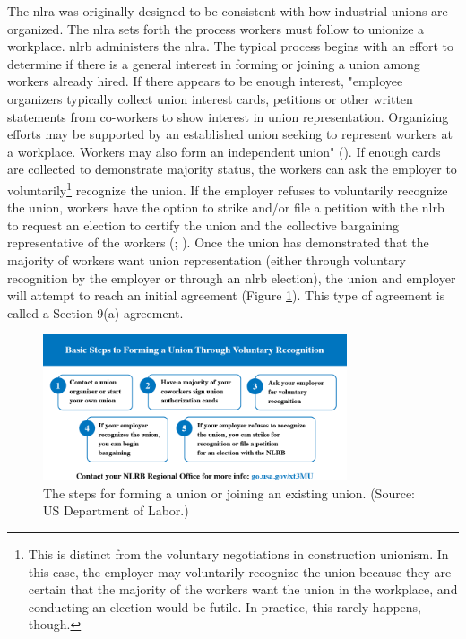 \documentclass[12pt]{article}
\newcommand{\imageWidth}{0.8\textwidth}
\begin{document}
The \acrfull{nlra} was originally designed to be consistent with how industrial unions are organized. The \acrshort{nlra} sets forth the process workers must follow to unionize a workplace. \acrfull{nlrb} administers the \acrshort{nlra}. The typical process begins with an effort to determine if there is a general interest in forming or joining a union among workers already hired. If there appears to be enough interest, "employee organizers typically collect union interest cards, petitions or other written statements from co-workers to show interest in union representation. Organizing efforts may be supported by an established union seeking to represent workers at a workplace. Workers may also form an independent union" (\cite["How can I form a union?"]{dolWORKCenterUnions}). If enough cards are collected to demonstrate majority status, the workers can ask the employer to voluntarily\footnote{This is distinct from the voluntary negotiations in construction unionism. In this case, the employer may voluntarily recognize the union because they are certain that the majority of the workers want the union in the workplace, and conducting an election would be futile. In practice, this rarely happens, though.} recognize the union. If the employer refuses to voluntarily recognize the union, workers have the option to strike and/or file a petition with the \acrshort{nlrb} to request an election to certify the union and the collective bargaining representative of the workers (\cite["How can I form a union?"]{dolWORKCenterUnions}; \cite{nlrbNLRBProcess}). Once the union has demonstrated that the majority of workers want union representation (either through voluntary recognition by the employer or through an \acrshort{nlrb} election), the union and employer will attempt to reach an initial agreement (Figure \ref{fig:DOL}). This type of agreement is called a Section 9(a) agreement.

\begin{figure}[ht]
  \centering
  \includegraphics[width=\imageWidth]{images/DOL}
  \captionsetup{justification=centering, singlelinecheck=false, margin=2cm}
  \caption[Forming a Union]{The steps for forming a union or joining an existing union. (Source: US Department of Labor.)}
  \label{fig:DOL}
\end{figure}
\end{document}
